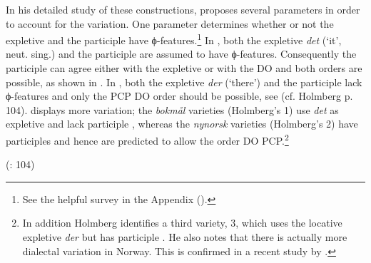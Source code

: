 \documentclass[output=paper]{LSP/langsci}
\begin{document}
\noindent In his detailed study of these constructions, \citet{Holmberg2002Expletives} proposes several parameters in order to account for the variation. One parameter determines whether or not the expletive and the participle have ϕ-features.\footnote{See the helpful survey in the Appendix (\citealt[125f]{Holmberg2002Expletives}).
} In , both the expletive \textit{det} (‘it’, neut. sing.) and the participle are assumed to have ϕ-features. Consequently the participle can agree either with the expletive or with the DO and both orders are possible, as shown in . In , both the expletive \textit{der} (‘there’) and the participle lack ϕ-features and only the PCP DO order should be possible, see  (cf. Holmberg p. 104).  displays more variation; the \textit{bokmål} varieties (Holmberg’s  1) use \textit{det} as expletive and lack participle  , whereas the \textit{nynorsk} varieties (Holmberg’s  2) have  participles  and hence are predicted to allow the order DO PCP.\footnote{In addition Holmberg identifies a third variety,  3, which uses the locative expletive \textit{der} but has participle . He also notes that there is actually more dialectal variation in Norway. This is confirmed in a recent study by \citet{AaEtAl2014}.}


\ea%
    \label{ex:engdahl:2}
     (\citealt{Holmberg2002}: 104)
\z
\z
\end{document}
